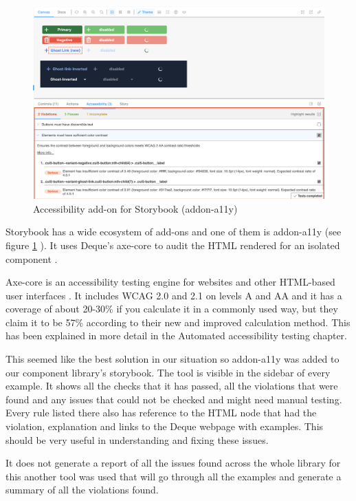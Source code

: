 \documentclass{master_thesis}
\begin{document}
\begin{figure}[h!]
	\includegraphics[width=\textwidth]{img/addon-a11y.png}
	\caption{Accessibility add-on for Storybook (addon-a11y)}
	\label{fig:addon-a11y}
\end{figure}

Storybook has a wide ecosystem of add-ons and one of them is addon-a11y (see figure \ref{fig:addon-a11y} ). It uses Deque's axe-core to audit the HTML rendered for an isolated component \citep{addon-a11y}.

Axe-core is an accessibility testing engine for websites and other HTML-based user interfaces \citep{Deque2023}. It includes WCAG 2.0 and 2.1 on levels A and AA and it has a coverage of about 20-30\% if you calculate it in a commonly used way, but they claim it to be 57\% according to their new and improved calculation method. This has been explained in more detail in the Automated accessibility testing chapter.

This seemed like the best solution in our situation so addon-a11y was added to our component library’s storybook. The tool is visible in the sidebar of every example. It shows all the checks that it has passed, all the violations that were found and any issues that could not be checked and might need manual testing. Every rule listed there also has reference to the HTML node that had the violation, explanation and links to the Deque webpage with examples. This should be very useful in understanding and fixing these issues.

It does not generate a report of all the issues found across the whole library for this another tool was used that will go through all the examples and generate a summary of all the violations found.
\end{document}
